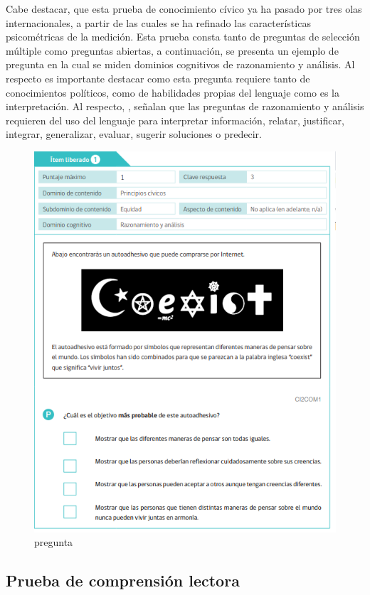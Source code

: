 \documentclass[12pt,twoside]{templates/facsothesis}
\begin{document}
Cabe destacar, que esta prueba de conocimiento cívico ya ha pasado por tres olas internacionales, a partir de las cuales se ha refinado las características psicométricas de la medición. Esta prueba consta tanto de preguntas de selección múltiple como preguntas abiertas, a continuación, se presenta un ejemplo de pregunta en la cual se miden dominios cognitivos de razonamiento y análisis. Al respecto es importante destacar como esta pregunta requiere tanto de conocimientos políticos, como de habilidades propias del lenguaje como es la interpretación. Al respecto, \citet{schulz_Estudio_2011}, señalan que las preguntas de razonamiento y análisis requieren del uso del lenguaje para interpretar información, relatar, justificar, integrar, generalizar, evaluar, sugerir soluciones o predecir.

\begin{figure}

{\centering \includegraphics[width=0.8\linewidth]{images/Pregunta-liberada1} 

}

\caption{pregunta}\label{fig:unnamed-chunk-4}
\end{figure}

\hypertarget{prueba-de-comprensiuxf3n-lectora}{%
\subsection{Prueba de comprensión lectora}\label{prueba-de-comprensiuxf3n-lectora}}
\end{document}
